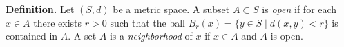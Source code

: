 \textbf{Definition.} Let $(S, d)$ be a metric space. A subset $A \subset S$ is \textit{open} if for each $x \in A$ there exists $r > 0$ such that the ball $B_r(x) = \{y \in S \mid d(x, y) < r\}$ is contained in $A$. A set $A$ is a \textit{neighborhood} of $x$ if $x \in A$ and $A$ is open.
